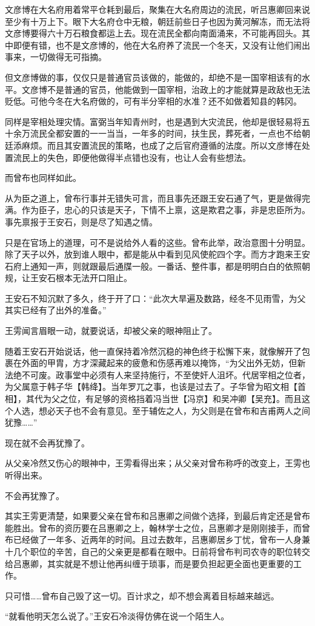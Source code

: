 文彦博在大名府用着常平仓耗到最后，聚集在大名府周边的流民，听吕惠卿回来说至少有十万上下。眼下大名府仓中无粮，朝廷前些日子也因为黄河解冻，而无法将文彦博要得六十万石粮食都运上去。现在流民全都向南面涌来，不可能再回头。其中即便有错，也不是文彦博的，他在大名府养了流民一个冬天，又没有让他们闹出事来，一切做得无可指摘。

但文彦博做的事，仅仅只是普通官员该做的，能做的，却绝不是一国宰相该有的水平。文彦博不是普通的官员，他能做到一国宰相，治政上的才能就算是政敌也无法贬低。可他今冬在大名府做的，可有半分宰相的水准？还不如做着知县的韩冈。

同样是宰相处理灾情。富弼当年知青州时，也是遇到大灾流民，他却是很轻易将五十余万流民全都安置的一一当当，一年多的时间，扶生民，葬死者，一点也不给朝廷添麻烦。而且其安置流民的策略，也成了之后官府遵循的法度。所以文彦博在处置流民上的失色，即便他做得半点错也没有，也让人会有些想法。

而曾布也同样如此。

从为臣之道上，曾布行事并无错失可言，而且事先还跟王安石通了气，更是做得完满。作为臣子，忠心的只该是天子，下情不上禀，这是欺君之事，非是忠臣所为。事先禀报于王安石，则是尽了知遇之情。

只是在官场上的道理，可不是说给外人看的这些。曾布此举，政治意图十分明显。除了天子以外，放到谁人眼中，都是能从中看到见风使舵四个字。而方才跑来王安石府上通知一声，则就跟最后通牒一般。一番话、整件事，都是明明白白的依照朝规，让王安石根本无法开口阻止。

王安石不知沉默了多久，终于开了口：“此次大旱遍及数路，经冬不见雨雪，为父其实已经有了出外的准备。”

王雱闻言眉眼一动，就要说话，却被父亲的眼神阻止了。

随着王安石开始说话，他一直保持着冷然沉稳的神色终于松懈下来，就像解开了包裹在外面的甲胄，方才深藏起来的疲惫和伤感再难以掩饰，“为父出外无妨，但新法绝不可废。政事堂中必须有人来坚持施行，不至使奸人沮坏。代居宰相之位者，为父属意于韩子华【韩绛】。当年罗兀之事，也该是过去了。子华曾为昭文相【首相】，其代为父之位，有足够的资格挡着冯当世【冯京】和吴冲卿【吴充】。而且这个人选，想必天子也不会有意见。至于辅佐之人，为父则是在曾布和吉甫两人之间犹豫……”

现在就不会再犹豫了。

从父亲冷然又伤心的眼神中，王雱看得出来；从父亲对曾布称呼的改变上，王雱也听得出来。

不会再犹豫了。

其实王雱更清楚，如果要父亲在曾布和吕惠卿之间做个选择，到最后肯定还是曾布能胜出。曾布的资历要在吕惠卿之上，翰林学士之位，吕惠卿才是刚刚接手，而曾布已经做了一年多、近两年的时间。且过去数年，吕惠卿居乡丁忧，曾布一人身兼十几个职位的辛苦，自己的父亲更是都看在眼中。日前将曾布判司农寺的职位转交给吕惠卿，其实就是不想让他再纠缠于琐事，而是要负担起更全面也更重要的工作。

只可惜……曾布自己毁了这一切。百计求之，却不想会离着目标越来越远。

“就看他明天怎么说了。”王安石冷淡得仿佛在说一个陌生人。

